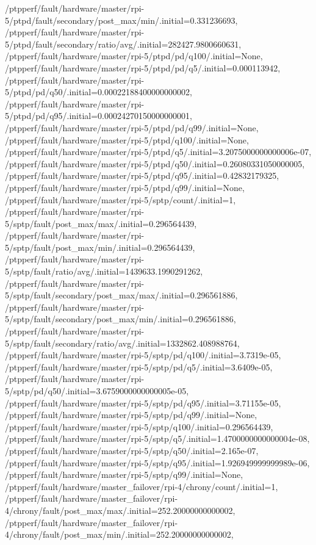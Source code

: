 {    /ptpperf/fault/hardware/master/rpi-5/ptpd/fault/secondary/post_max/min/.initial=0.331236693,
    /ptpperf/fault/hardware/master/rpi-5/ptpd/fault/secondary/ratio/avg/.initial=282427.9800660631,
    /ptpperf/fault/hardware/master/rpi-5/ptpd/pd/q100/.initial=None,
    /ptpperf/fault/hardware/master/rpi-5/ptpd/pd/q5/.initial=0.000113942,
    /ptpperf/fault/hardware/master/rpi-5/ptpd/pd/q50/.initial=0.00022188400000000002,
    /ptpperf/fault/hardware/master/rpi-5/ptpd/pd/q95/.initial=0.00024270150000000001,
    /ptpperf/fault/hardware/master/rpi-5/ptpd/pd/q99/.initial=None,
    /ptpperf/fault/hardware/master/rpi-5/ptpd/q100/.initial=None,
    /ptpperf/fault/hardware/master/rpi-5/ptpd/q5/.initial=3.2075000000000006e-07,
    /ptpperf/fault/hardware/master/rpi-5/ptpd/q50/.initial=0.26080331050000005,
    /ptpperf/fault/hardware/master/rpi-5/ptpd/q95/.initial=0.42832179325,
    /ptpperf/fault/hardware/master/rpi-5/ptpd/q99/.initial=None,
    /ptpperf/fault/hardware/master/rpi-5/sptp/count/.initial=1,
    /ptpperf/fault/hardware/master/rpi-5/sptp/fault/post_max/max/.initial=0.296564439,
    /ptpperf/fault/hardware/master/rpi-5/sptp/fault/post_max/min/.initial=0.296564439,
    /ptpperf/fault/hardware/master/rpi-5/sptp/fault/ratio/avg/.initial=1439633.1990291262,
    /ptpperf/fault/hardware/master/rpi-5/sptp/fault/secondary/post_max/max/.initial=0.296561886,
    /ptpperf/fault/hardware/master/rpi-5/sptp/fault/secondary/post_max/min/.initial=0.296561886,
    /ptpperf/fault/hardware/master/rpi-5/sptp/fault/secondary/ratio/avg/.initial=1332862.408988764,
    /ptpperf/fault/hardware/master/rpi-5/sptp/pd/q100/.initial=3.7319e-05,
    /ptpperf/fault/hardware/master/rpi-5/sptp/pd/q5/.initial=3.6409e-05,
    /ptpperf/fault/hardware/master/rpi-5/sptp/pd/q50/.initial=3.6759000000000005e-05,
    /ptpperf/fault/hardware/master/rpi-5/sptp/pd/q95/.initial=3.71155e-05,
    /ptpperf/fault/hardware/master/rpi-5/sptp/pd/q99/.initial=None,
    /ptpperf/fault/hardware/master/rpi-5/sptp/q100/.initial=0.296564439,
    /ptpperf/fault/hardware/master/rpi-5/sptp/q5/.initial=1.4700000000000004e-08,
    /ptpperf/fault/hardware/master/rpi-5/sptp/q50/.initial=2.165e-07,
    /ptpperf/fault/hardware/master/rpi-5/sptp/q95/.initial=1.926949999999989e-06,
    /ptpperf/fault/hardware/master/rpi-5/sptp/q99/.initial=None,
    /ptpperf/fault/hardware/master_failover/rpi-4/chrony/count/.initial=1,
    /ptpperf/fault/hardware/master_failover/rpi-4/chrony/fault/post_max/max/.initial=252.20000000000002,
    /ptpperf/fault/hardware/master_failover/rpi-4/chrony/fault/post_max/min/.initial=252.20000000000002,
}
